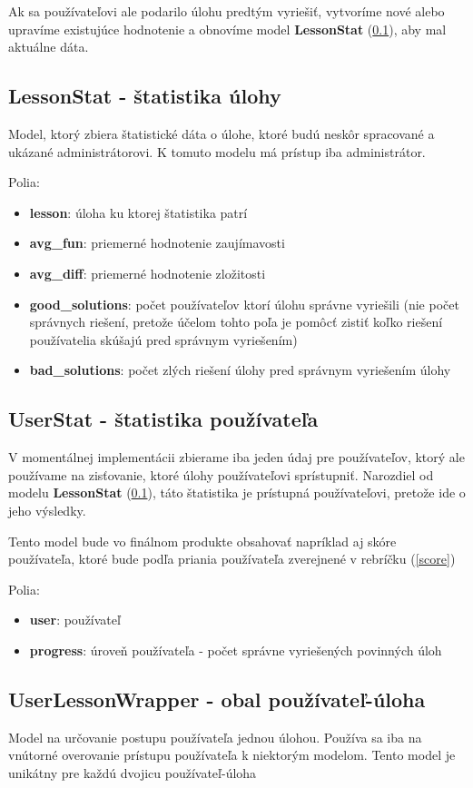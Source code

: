Ak sa používateľovi ale podarilo úlohu predtým
vyriešiť, vytvoríme nové alebo upravíme existujúce hodnotenie a obnovíme model \textbf{LessonStat} (\ref{modelLessonStat}),
aby mal aktuálne dáta.
\subsection{LessonStat - štatistika úlohy}
\label{modelLessonStat}
Model, ktorý zbiera štatistické dáta o úlohe, ktoré budú neskôr spracované a ukázané administrátorovi.
K tomuto modelu má prístup iba administrátor.

Polia:
\begin{itemize}
\item \textbf{lesson}: úloha ku ktorej štatistika patrí
\item \textbf{avg\_fun}: priemerné hodnotenie zaujímavosti
\item \textbf{avg\_diff}: priemerné hodnotenie zložitosti
\item \textbf{good\_solutions}: počet používateľov ktorí úlohu správne vyriešili
  (nie počet správnych riešení, pretože účelom tohto poľa je pomôcť zistiť koľko riešení
  používatelia skúšajú pred správnym vyriešením)
\item \textbf{bad\_solutions}: počet zlých riešení úlohy pred správnym vyriešením úlohy
\end{itemize}

\subsection{UserStat - štatistika používateľa}
\label{modelUserStat}
V momentálnej implementácii zbierame iba jeden údaj pre používateľov, ktorý ale používame
na zisťovanie, ktoré úlohy používateľovi sprístupniť. Narozdiel od modelu \textbf{LessonStat} (\ref{modelLessonStat}),
táto štatistika je prístupná používateľovi, pretože ide o jeho výsledky.

Tento model bude vo finálnom produkte obsahovať napríklad aj skóre používateľa, ktoré
bude podľa priania používateľa zverejnené v rebríčku (\ref{score})

Polia:
\begin{itemize}
\item \textbf{user}: používateľ
\item \textbf{progress}: úroveň používateľa - počet správne vyriešených povinných úloh
\end{itemize}

\subsection{UserLessonWrapper - obal používateľ-úloha}
\label{modelWrapper}
Model na určovanie postupu používateľa jednou úlohou. Používa sa iba na vnútorné
overovanie prístupu používateľa k niektorým modelom. Tento model je unikátny pre každú
dvojicu používateľ-úloha

